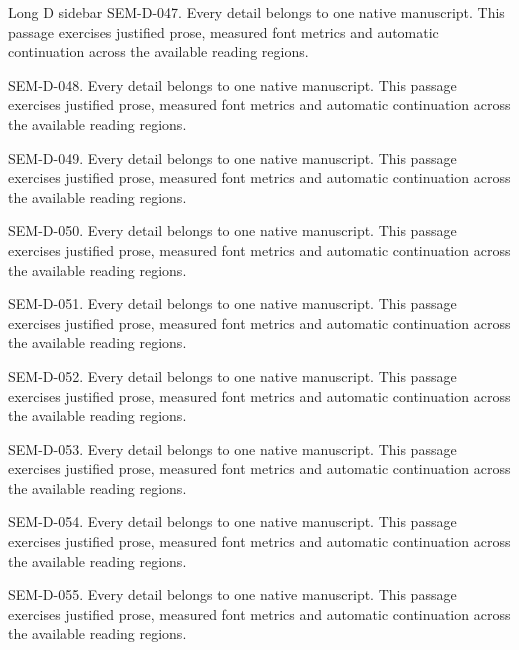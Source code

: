 \begin{m20sidebarwide}[columns=2,id=long-wide2]{Long D sidebar}
SEM-D-047. Every detail belongs to one native manuscript. This passage exercises justified prose, measured font metrics and automatic continuation across the available reading regions.\par
SEM-D-048. Every detail belongs to one native manuscript. This passage exercises justified prose, measured font metrics and automatic continuation across the available reading regions.\par
SEM-D-049. Every detail belongs to one native manuscript. This passage exercises justified prose, measured font metrics and automatic continuation across the available reading regions.\par
SEM-D-050. Every detail belongs to one native manuscript. This passage exercises justified prose, measured font metrics and automatic continuation across the available reading regions.\par
SEM-D-051. Every detail belongs to one native manuscript. This passage exercises justified prose, measured font metrics and automatic continuation across the available reading regions.\par
SEM-D-052. Every detail belongs to one native manuscript. This passage exercises justified prose, measured font metrics and automatic continuation across the available reading regions.\par
SEM-D-053. Every detail belongs to one native manuscript. This passage exercises justified prose, measured font metrics and automatic continuation across the available reading regions.\par
SEM-D-054. Every detail belongs to one native manuscript. This passage exercises justified prose, measured font metrics and automatic continuation across the available reading regions.\par
SEM-D-055. Every detail belongs to one native manuscript. This passage exercises justified prose, measured font metrics and automatic continuation across the available reading regions.\par
\end{m20sidebarwide}
